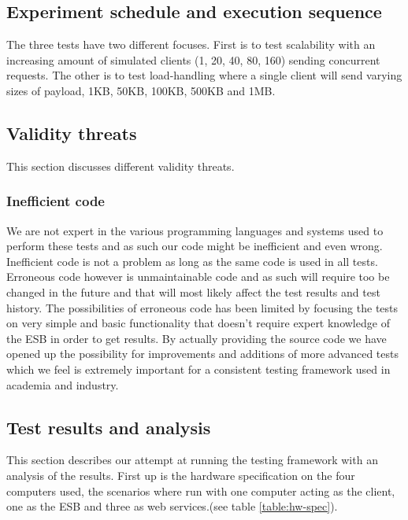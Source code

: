 \subsection{Experiment schedule and execution sequence}
The three tests have two different focuses. First is to test scalability with an increasing amount of simulated clients (1, 20, 40, 80, 160) sending concurrent requests. 
The other is to test load-handling where a single client will send varying sizes of payload, 1KB, 50KB, 100KB, 500KB and 1MB.
\subsection{Validity threats}
This section discusses different validity threats.
\subsubsection{Inefficient code}
We are not expert in the various programming languages and systems used to perform these tests and as such our code might be inefficient and even wrong. Inefficient code is not a problem as long as the same code is used in all tests. Erroneous code however is unmaintainable code and as such will require too be changed in the future and that will most likely affect the test results and test history. 
The possibilities of erroneous code has been limited by focusing the tests on very simple and basic functionality that doesn't require expert knowledge of the ESB in order to get results.
By actually providing the source code we have opened up the possibility for improvements and additions of more advanced tests which we feel is extremely important for a consistent testing framework used in academia and industry.

\subsection{Test results and analysis}


This section describes our attempt at running the testing framework with an analysis of the results.
First up is the hardware specification on the four computers used, the scenarios where run with one computer acting as the client, one as the ESB and three as web services.(see table \ref{table:hw-spec}). 

